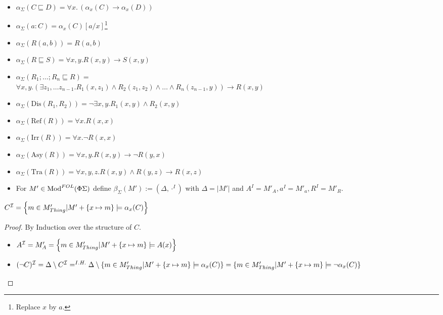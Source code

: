 \documentclass[%
\ifpretendfinal
final%
\else
draft%
\fi,
a4paper,
wd]{isov2}
\begin{document}
\begin{itemize}
 \item $\alpha_\Sigma (C \sqsubseteq D) = \forall x.\, (\alpha_x(C) \rightarrow \alpha_x(D))$
 \item $\alpha_\Sigma (a:C) = \alpha_x(C)[a/x]$\footnote{Replace $x$ by $a$.}
 \item $\alpha_\Sigma (R(a,b)) = R(a,b)$
 \item $\alpha_\Sigma (R \sqsubseteq S) = \forall x, y. R(x,y) \rightarrow S(x,y) $
 \item $\alpha_\Sigma (R_1; \ldots; R_n \sqsubseteq R) =$\\
$ \forall x,y . (\exists z_1,\ldots z_{n-1} . R_1(x,z_1) \wedge R_2(z_1,z_2) \wedge \ldots \wedge R_n(z_{n-1},y)) \rightarrow R(x,y) $
 \item $\alpha_\Sigma (\text{Dis}(R_1,R_2)) = \neg\exists x,y . R_1(x,y)\wedge R_2(x,y)$	
 \item $\alpha_\Sigma (\text{Ref}(R)) = \forall x. R(x,x)$
 \item $\alpha_\Sigma (\text{Irr}(R)) = \forall x. \neg R(x,x)$
 \item $\alpha_\Sigma (\text{Asy}(R)) = \forall x,y . R(x,y) \rightarrow \neg R(y,x)$
 \item $\alpha_\Sigma (\text{Tra}(R)) = \forall x,y,z . R(x,y) \wedge R(y,z) \rightarrow R(x,z)$
\end{itemize}






\begin{itemize}
	\item For $M' \in \text{Mod}^{FOL}(\Phi \Sigma)$ define $\beta_\Sigma(M') := (\Delta, \cdot^I)$
	with $\Delta = |M'|$ and $A^I = M'_A, a^I = M'_a, R^I = M'_R$.
\end{itemize}

	\begin{proposition}
$C^{\mathcal{I}} = \left\{m \in M'_{{Thing} } \lvert M' + \{x \mapsto m \} \models \alpha_x (C) \right\}$
	\end{proposition}
	
	\begin{proof} By Induction over the structure of $C$.
\begin{itemize}
	\item $A^{\mathcal{I}} = M'_A = \left \{m \in M'_{{Thing} } \vert M' + \{x \mapsto m \} \models A(x)  \right\}$
	\item $(\lnot C)^{\mathcal{I}} = \Delta \setminus C^{\mathcal{I}} =^{I.H.} \Delta \setminus \{m \in M'_{Thing}  \lvert M' + \{x \mapsto m\} \models \alpha_x(C)\} = \{m \in M'_{Thing}  \vert M' + \{x \mapsto m\} \models \lnot \alpha_x(C)\}$
\end{itemize}
	\end{proof}
\end{document}
